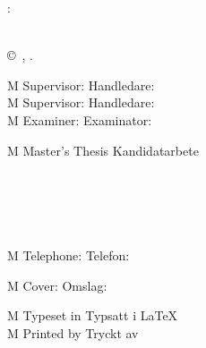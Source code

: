 \begingroup %
\newpage
\thispagestyle{empty}
\vspace*{4.5cm}
\thesisImprintTitle:\\
\thesisImprintSubtitle\\[1ex]
\thesisAuthor \setlength{\parskip}{2\baselineskip}

\copyright~\thesisAuthor, \thesisYear.

\if\thesisType M
	Supervisor:
\else
	Handledare:
\fi
\thesisSupervisorMain\\
\ifdefined\thesisSupervisorSecond
	\if\thesisType M
		Supervisor:
	\else
		Handledare:
	\fi
	\thesisSupervisorSecond\\
\fi
\if\thesisType M
	Examiner:
\else
	Examinator:
\fi
\thesisExaminer

\if\thesisType M
	Master's Thesis
\else
	Kandidatarbete
\fi
\thesisYear\\
\thesisDepartment\\
\thesisDivision\\
\ifx\thesisGroup\undefined
\else
	\thesisGroup\\
\fi
\thesisUniversity\\
\thesisImprintLocation\\
\if\thesisType M
	Telephone:
\else
	Telefon:
\fi
\thesisUniversityTel

\vfill
\ifx\thesisCoverFigure\undefined
\else
	\if\thesisType M
		Cover:
	\else
		Omslag:
	\fi
	\thesisCoverFigureCaption
	\setlength{\parskip}{\baselineskip} \fi

\if\thesisType M
	Typeset in
\else
	Typsatt i
\fi
\LaTeX\\
\ifx\thesisPrintedBy\undefined
\else
	\if\thesisType M
		Printed by
	\else
		Tryckt av
	\fi
	\thesisPrintedBy\\
\fi
\thesisLocation\ \thesisYear
\endgroup